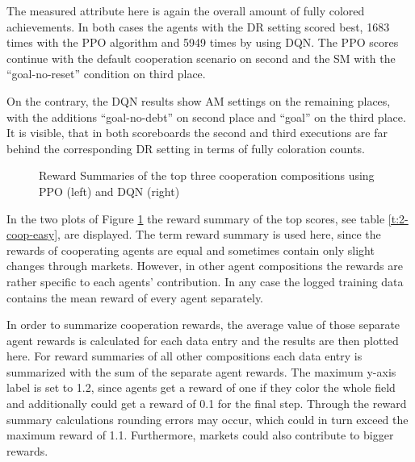 The measured attribute here is again the overall amount of fully colored achievements. In both cases the agents with the DR setting scored best, 1683 times with the PPO algorithm and 5949 times by using DQN. The PPO scores continue with the default cooperation scenario on second and the SM with the ``goal-no-reset'' condition on third place. 

On the contrary, the DQN results show AM settings on the remaining places, with the additions ``goal-no-debt'' on second place and ``goal'' on the third place. It is visible, that in both scoreboards the second and third executions are far behind the corresponding DR setting in terms of fully coloration counts.

\begin{figure}[hpbt]
    \centering
    \hspace{0.01\textwidth}
    \caption[Reward Summaries of the Top Cooperation Modes in a 5x5 Environment]{Reward Summaries of the top three cooperation compositions using PPO (left) and DQN (right)}
    \label{fig:multipic_plots_coop_easy} %
\end{figure}

In the two plots of Figure \ref{fig:multipic_plots_coop_easy} the reward summary of the top scores, see table \ref{t:2-coop-easy}, are displayed. The term reward summary is used here, since the rewards of cooperating agents are equal and sometimes contain only slight changes through markets. However, in other agent compositions the rewards are rather specific to each agents' contribution. In any case the logged training data contains the mean reward of every agent separately. 

In order to summarize cooperation rewards, the average value of those separate agent rewards is calculated for each data entry and the results are then plotted here. For reward summaries of all other compositions each data entry is summarized with the sum of the separate agent rewards. The maximum y-axis label is set to 1.2, since agents get a reward of one if they color the whole field and additionally could get a reward of 0.1 for the final step. Through the reward summary calculations rounding errors may occur, which could in turn exceed the maximum reward of 1.1. Furthermore, markets could also contribute to bigger rewards. 

